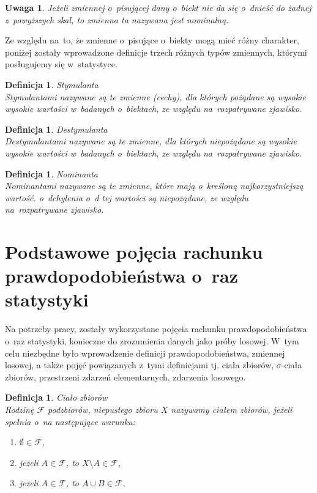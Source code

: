 \documentclass[12pt,a4paper]{report}
\newtheorem{definition}[theorem]{Definicja}
\newtheorem{uwaga}{Uwaga}
\begin{document}
\begin{uwaga}
Jeżeli zmiennej o~pisującej dany o~biekt nie da się o~dnieść do żadnej z~powyższych skal, to zmienna ta nazywana jest nominalną.
\end{uwaga}

Ze względu na~to, że zmienne o~pisujące o~biekty mogą mieć różny charakter, poniżej zostały wprowadzone definicje trzech różnych typów zmiennych, którymi posługujemy się w~statystyce. 

\begin{definition}{Stymulanta \cite[Rozdział 1.5]{panek2013}}\\
Stymulantami nazywane są te zmienne (cechy), dla których pożądane są wysokie wysokie wartości w~badanych o~biektach, ze względu na~rozpatrywane zjawisko. 
\end{definition}

\begin{definition}{Destymulanta \cite[Rozdział 1.5]{panek2013}}\\
Destymulantami nazywane są te  zmienne, dla których niepożądane są wysokie wysokie wartości w~badanych o~biektach, ze względu na~rozpatrywane zjawisko. 
\end{definition}

\begin{definition}{Nominanta \cite[Rozdział 1.5]{panek2013}}\\
Nominantami nazywane są te zmienne, które mają o~kreśloną najkorzystniejszą wartość. o~dchylenia o~d tej wartości są niepożądane, ze względu na~rozpatrywane zjawisko. 
\end{definition}



\section{Podstawowe pojęcia rachunku prawdopodobieństwa o~raz statystyki} \label{rachunek prawdopodobienstwa}


Na potrzeby pracy, zostały wykorzystane pojęcia rachunku prawdopodobieństwa o~raz statystyki, konieczne do zrozumienia danych jako próby losowej. W~tym celu niezbędne było wprowadzenie definicji prawdopodobieństwa, zmiennej losowej, a także pojęć powiązanych z~tymi definicjami tj. ciała zbiorów, $\sigma$-ciała zbiorów, przestrzeni zdarzeń elementarnych, zdarzenia losowego.


\begin{definition}{Ciało zbiorów \cite[Rozdział 8.1]{rudnicki2006}}\\
Rodzinę $\mathcal{F}$ podzbiorów, niepustego zbioru $X$ nazywamy ciałem zbiorów, jeżeli spełnia o~na następujące warunku: 
\begin{enumerate}
\item $\emptyset \in \mathcal{F}$,
\item jeżeli $A \in \mathcal{F}$, to $X \setminus A \in \mathcal{F}$,
\item jeżeli $A \in \mathcal{F}$, to $A \cup B \in \mathcal{F}$.
\end{enumerate}
\end{definition}
\end{document}
